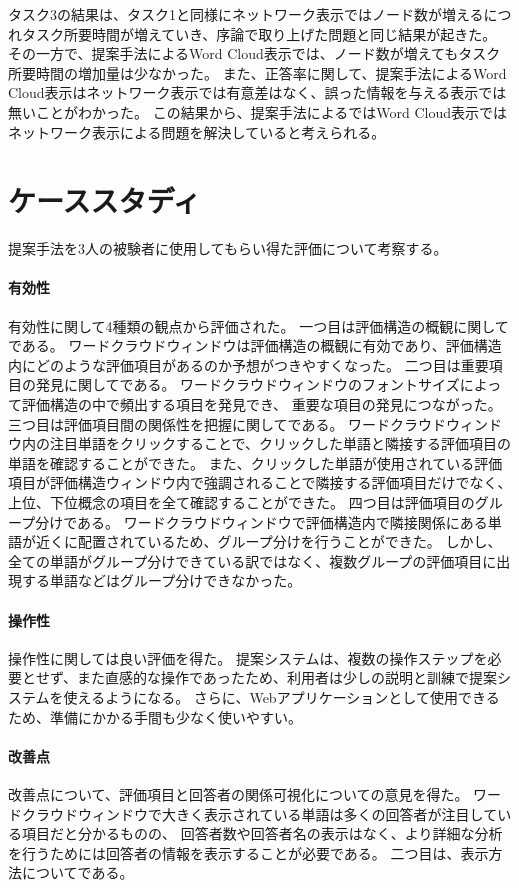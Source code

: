 \documentclass[syuuron]{kuee}
\begin{document}
	タスク3の結果は、タスク1と同様にネットワーク表示ではノード数が増えるにつれタスク所要時間が増えていき、序論で取り上げた問題と同じ結果が起きた。
	その一方で、提案手法によるWord Cloud表示では、ノード数が増えてもタスク所要時間の増加量は少なかった。
	また、正答率に関して、提案手法によるWord Cloud表示はネットワーク表示では有意差はなく、誤った情報を与える表示では無いことがわかった。
	この結果から、提案手法によるではWord Cloud表示ではネットワーク表示による問題を解決していると考えられる。
	
	\section{ケーススタディ}%
	提案手法を3人の被験者に使用してもらい得た評価について考察する。
		\paragraph{有効性}
		有効性に関して4種類の観点から評価された。
		一つ目は評価構造の概観に関してである。
		ワードクラウドウィンドウは評価構造の概観に有効であり、評価構造内にどのような評価項目があるのか予想がつきやすくなった。
		二つ目は重要項目の発見に関してである。
		ワードクラウドウィンドウのフォントサイズによって評価構造の中で頻出する項目を発見でき、
		重要な項目の発見につながった。
		三つ目は評価項目間の関係性を把握に関してである。
		ワードクラウドウィンドウ内の注目単語をクリックすることで、クリックした単語と隣接する評価項目の単語を確認することができた。
		また、クリックした単語が使用されている評価項目が評価構造ウィンドウ内で強調されることで隣接する評価項目だけでなく、
		上位、下位概念の項目を全て確認することができた。
		四つ目は評価項目のグループ分けである。
		ワードクラウドウィンドウで評価構造内で隣接関係にある単語が近くに配置されているため、グループ分けを行うことができた。
		しかし、全ての単語がグループ分けできている訳ではなく、複数グループの評価項目に出現する単語などはグループ分けできなかった。
		
		\paragraph{操作性}
		操作性に関しては良い評価を得た。
		提案システムは、複数の操作ステップを必要とせず、また直感的な操作であったため、利用者は少しの説明と訓練で提案システムを使えるようになる。
		さらに、Webアプリケーションとして使用できるため、準備にかかる手間も少なく使いやすい。
		
		\paragraph{改善点}
		改善点について、評価項目と回答者の関係可視化についての意見を得た。
		ワードクラウドウィンドウで大きく表示されている単語は多くの回答者が注目している項目だと分かるものの、
		回答者数や回答者名の表示はなく、より詳細な分析を行うためには回答者の情報を表示することが必要である。
		二つ目は、表示方法についてである。
		
\end{document}
